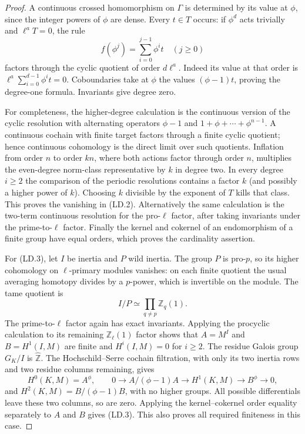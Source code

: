 \begin{proof}
A continuous crossed homomorphism on $\Gamma$ is determined by its
value at $\phi$, since the integer powers of $\phi$ are dense.  Every
$t\in T$ occurs: if $\phi^d$ acts trivially and $\ell^aT=0$, the rule
\[
 f(\phi^j)=\sum_{i=0}^{j-1}\phi^it\quad(j\ge0)
\]
factors through the cyclic quotient of order $d\ell^a$.  Indeed its
value at that order is $\ell^a\sum_{i=0}^{d-1}\phi^it=0$.
Coboundaries take at $\phi$ the values $(\phi-1)t$, proving the
degree-one formula.  Invariants give degree zero.

For completeness, the higher-degree calculation is the continuous
version of the cyclic resolution with alternating operators
$\phi-1$ and $1+\phi+\cdots+\phi^{n-1}$.  A continuous cochain with
finite target factors through a finite cyclic quotient; hence continuous
cohomology is the direct limit over such quotients.  Inflation from
order $n$ to order $kn$, where both actions factor through order $n$,
multiplies the even-degree norm-class representative by $k$ in degree
two.  In every degree $i\ge2$ the comparison of the periodic
resolutions contains a factor $k$ (and possibly a higher power of $k$).
Choosing $k$ divisible by the exponent of $T$ kills that class.
This proves the vanishing in (LD.2).  Alternatively the same calculation
is the two-term continuous resolution for the pro-$\ell$ factor,
after taking invariants under the prime-to-$\ell$ factor.  Finally the
kernel and cokernel of an endomorphism of a finite group have equal
orders, which proves the cardinality assertion.

For (LD.3), let $I$ be inertia and $P$ wild inertia.  The group $P$ is
pro-$p$, so its higher cohomology on $\ell$-primary modules vanishes:
on each finite quotient the usual averaging homotopy divides by a
$p$-power, which is invertible on the module.  The tame quotient is
\[
 I/P\simeq\prod_{q\ne p}\mathbb Z_q(1).
\]
The prime-to-$\ell$ factor again has exact invariants.  Applying the
procyclic calculation to its remaining $\mathbb Z_\ell(1)$ factor
shows that $A=M^I$ and $B=H^1(I,M)$ are finite and $H^i(I,M)=0$ for
$i\ge2$.  The residue Galois group $G_K/I$ is
$\widehat{\mathbb Z}$.  The Hochschild--Serre cochain filtration,
with only its two inertia rows and two residue columns remaining, gives
\[
 H^0(K,M)=A^\phi,\qquad
 0\longrightarrow A/(\phi-1)A\longrightarrow H^1(K,M)
   \longrightarrow B^\phi\longrightarrow0,
 \tag{LD.4}
\]
and $H^2(K,M)=B/(\phi-1)B$, with no higher groups.  All possible
differentials leave these two columns, so are zero.  Applying the
kernel--cokernel order equality separately to $A$ and $B$ gives
(LD.3).  This also proves all required finiteness in this case.
\end{proof}

